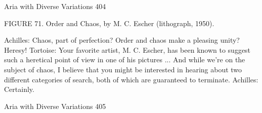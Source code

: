 Aria with Diverse Variations                                                              404

FIGURE 71. Order and Chaos, by M. C. Escher (lithograph, 1950).

Achilles: Chaos, part of perfection? Order and chaos make a pleasing unity? Heresy!
Tortoise: Your favorite artist, M. C. Escher, has been known to suggest such a heretical
    point of view in one of his pictures ... And while we're on the subject of chaos, I
    believe that you might be interested in hearing about two different categories of
    search, both of which are guaranteed to terminate.
Achilles: Certainly.




Aria with Diverse Variations                                                        405

